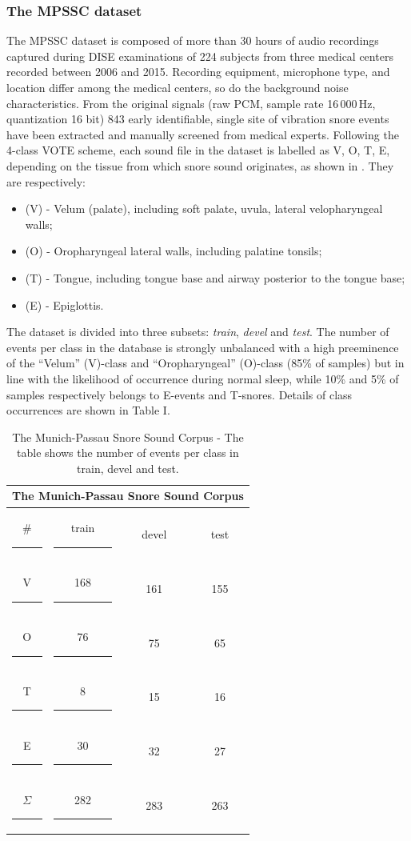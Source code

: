 \subsubsection{The MPSSC dataset}
\label{ssection:MPSSCdataset}
The MPSSC dataset is composed of more than 30 hours of audio recordings captured during DISE examinations of 224 subjects from three medical centers recorded between 2006 and 2015. Recording equipment, microphone type, and location differ among the medical centers, so do the background noise characteristics. From the original signals (raw PCM, sample rate 16\,000\,Hz, quantization 16 bit) 843 early identifiable, single site of vibration snore events have been extracted and manually screened from medical experts.
Following the 4-class VOTE scheme, each sound file in the dataset is labelled as V, O, T, E, depending on the tissue from which snore sound originates, as shown in . They are respectively:
\begin{itemize}
	\itemsep1mm
	\item (V) - Velum (palate), including soft palate, uvula, lateral velopharyngeal walls;
	\item (O) - Oropharyngeal lateral walls, including palatine tonsils;
	\item (T) - Tongue, including tongue base and airway posterior to the tongue base;
	\item (E) - Epiglottis.
\end{itemize}


The dataset is divided into three subsets: \textit{train}, \textit{devel} and \textit{test}.
The number of events per class in the database is strongly unbalanced with a high preeminence of the ``Velum'' (V)-class  and ``Oropharyngeal'' (O)-class (85\% of samples) but in line with the likelihood of occurrence during normal sleep, while 10\% and 5\% of samples respectively belongs to E-events and T-snores. Details of class occurrences are shown in Table I.

\begin{table}[h]
	\centering
	\begin{tabular}{cccc}
		\toprule
		\multicolumn{4}{c}{\textbf{The Munich-Passau Snore Sound Corpus}} \\
		\midrule
		\#  \rule{10pt}{0pt}	& train  \rule{10pt}{0pt} & devel & test\\
		\midrule
		V \rule{10pt}{0pt}	& 168  \rule{15pt}{0pt} & 161 & 155\\
		O \rule{10pt}{0pt}	& 76  \rule{15pt}{0pt} & 75 & 65\\
		T \rule{10pt}{0pt}	& 8  \rule{15pt}{0pt} & 15 & 16\\
		E \rule{10pt}{0pt}	& 30  \rule{15pt}{0pt}& 32 & 27\\
		\bottomrule
		$\Sigma$  \rule{10pt}{0pt} & 282  \rule{13pt}{0pt} & 283 & 263\\
	\end{tabular}
	\caption[The Munich-Passau Snore Sound Corpus]{The Munich-Passau Snore Sound Corpus - The table shows the number of events per class in train, devel and test.}
	\label{tab:mpssc} 
\end{table}

